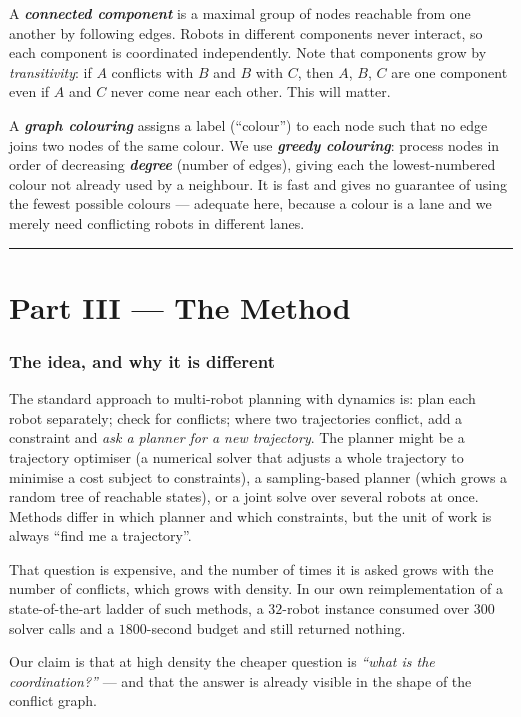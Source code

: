 \documentclass[11pt,a4paper]{article}
\newcommand{\defn}[1]{\textbf{\textit{#1}}}
\begin{document}
A \defn{connected component} is a maximal group of nodes reachable from one another by
following edges. Robots in different components never interact, so each component is
coordinated independently. Note that components grow by \emph{transitivity}: if $A$
conflicts with $B$ and $B$ with $C$, then $A$, $B$, $C$ are one component even if $A$ and
$C$ never come near each other. This will matter.

A \defn{graph colouring} assigns a label (``colour'') to each node such that no edge joins
two nodes of the same colour. We use \defn{greedy colouring}: process nodes in order of
decreasing \defn{degree} (number of edges), giving each the lowest-numbered colour not
already used by a neighbour. It is fast and gives no guarantee of using the fewest possible
colours --- adequate here, because a colour is a lane and we merely need conflicting robots
in different lanes.

\bigskip\hrule\bigskip

\part*{Part III --- The Method}

\section{The idea, and why it is different}

The standard approach to multi-robot planning with dynamics is: plan each robot separately;
check for conflicts; where two trajectories conflict, add a constraint and \emph{ask a
planner for a new trajectory}. The planner might be a trajectory optimiser (a numerical
solver that adjusts a whole trajectory to minimise a cost subject to constraints), a
sampling-based planner (which grows a random tree of reachable states), or a joint solve
over several robots at once. Methods differ in which planner and which constraints, but the
unit of work is always ``find me a trajectory''.

That question is expensive, and the number of times it is asked grows with the number of
conflicts, which grows with density. In our own reimplementation of a state-of-the-art
ladder of such methods, a $32$-robot instance consumed over $300$ solver calls and a
$1800$-second budget and still returned nothing.

Our claim is that at high density the cheaper question is \emph{``what is the
coordination?''} --- and that the answer is already visible in the shape of the conflict
graph.
\end{document}
